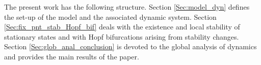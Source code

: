 The present work has the following structure. Section \ref{Sec:model_dyn} defines the set-up of the model and the associated dynamic system. Section \ref{Sec:fix_pnt_stab_Hopf_bif} deals with the existence and local stability of stationary states and with Hopf bifurcations arising from stability changes. Section \ref{Sec:glob_anal_conclusion} is devoted to the global analysis of dynamics and provides the main results of the paper. 

